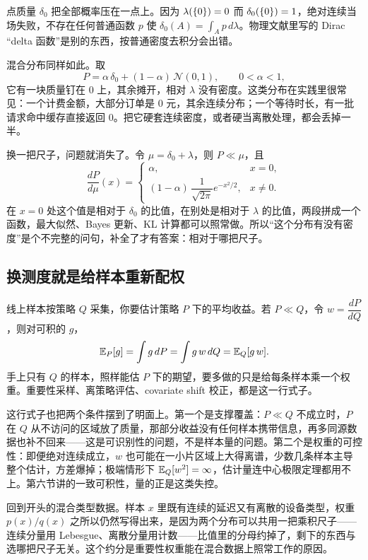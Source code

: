 点质量 \(\delta_0\) 把全部概率压在一点上。因为 \(\lambda(\left\{0\right\})=0\) 而 \(\delta_0(\left\{0\right\})=1\)，绝对连续当场失败，不存在任何普通函数 \(p\) 使 \(\delta_0(A)=\int_A p\,d\lambda\)。物理文献里写的 Dirac ``delta 函数''是别的东西，按普通密度去积分会出错。

混合分布同样如此。取
\[
P=\alpha\,\delta_0+(1-\alpha)\,\mathcal N(0,1),\qquad 0<\alpha<1,
\]
它有一块质量钉在 0 上，其余摊开，相对 \(\lambda\) 没有密度。这类分布在实践里很常见：一个计费金额，大部分订单是 0 元，其余连续分布；一个等待时长，有一批请求命中缓存直接返回 0。把它硬套连续密度，或者硬当离散处理，都会丢掉一半。

换一把尺子，问题就消失了。令 \(\mu=\delta_0+\lambda\)，则 \(P\ll\mu\)，且
\[
\frac{dP}{d\mu}(x)=
\begin{cases}
\alpha, & x=0,\\[2pt]
(1-\alpha)\,\dfrac{1}{\sqrt{2\pi}}e^{-x^{2}/2}, & x\ne 0.
\end{cases}
\]
在 \(x=0\) 处这个值是相对于 \(\delta_0\) 的比值，在别处是相对于 \(\lambda\) 的比值，两段拼成一个函数，最大似然、Bayes 更新、KL 计算都可以照常做。所以``这个分布有没有密度''是个不完整的问句，补全了才有答案：相对于哪把尺子。

\subsection{换测度就是给样本重新配权}

线上样本按策略 \(Q\) 采集，你要估计策略 \(P\) 下的平均收益。若 \(P\ll Q\)，令 \(w=\dfrac{dP}{dQ}\)，则对可积的 \(g\)，
\[
\mathbb{E}_P[g]=\int g\,dP=\int g\,w\,dQ=\mathbb{E}_Q[g\,w].
\]
手上只有 \(Q\) 的样本，照样能估 \(P\) 下的期望，要多做的只是给每条样本乘一个权重。重要性采样、离策略评估、covariate shift 校正，都是这一行式子。

这行式子也把两个条件摆到了明面上。第一个是支撑覆盖：\(P\ll Q\) 不成立时，\(P\) 在 \(Q\) 从不访问的区域放了质量，那部分收益没有任何样本携带信息，再多同源数据也补不回来——这是可识别性的问题，不是样本量的问题。第二个是权重的可控性：即便绝对连续成立，\(w\) 也可能在一小片区域上大得离谱，少数几条样本主导整个估计，方差爆掉；极端情形下 \(\mathbb{E}_Q[w^{2}]=\infty\)，估计量连中心极限定理都用不上。第六节讲的一致可积性，量的正是这类失控。

回到开头的混合类型数据。样本 \(x\) 里既有连续的延迟又有离散的设备类型，权重 \(p(x)/q(x)\) 之所以仍然写得出来，是因为两个分布可以共用一把乘积尺子——连续分量用 Lebesgue、离散分量用计数——比值里的分母约掉了，剩下的东西与选哪把尺子无关。这个约分是重要性权重能在混合数据上照常工作的原因。

